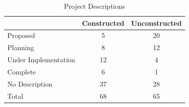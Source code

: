 \documentclass[12pt]{article}
\begin{document}


\begin{table}[h!]
\centering
\caption{Project Descriptions}\label{table:projectdescriptions}
\vspace{-2mm}
\begin{tabular}{l*{1}{cc}}
\toprule
 &Constructed &Unconstructed  \\
\midrule
Proposed   &          5  &    20  \\
Planning   &          8  &    12  \\
Under Implementation& 12 &     4  \\
Complete   &          6  &     1  \\
No Description &       37  &    28  \\ 
Total  &  68  &     65  \\
\bottomrule
\end{tabular}
\end{table}
\end{document}
